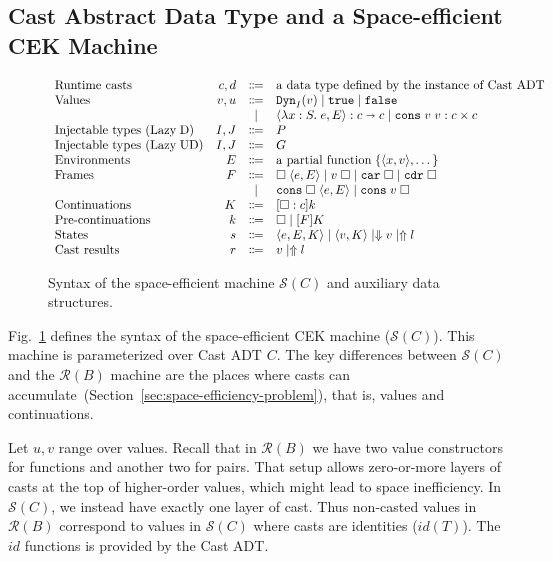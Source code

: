 \documentclass[runningheads]{llncs}
\newcommand{\stxrule}[3]{\text{#2} & #1 & \Coloneqq & #3\\}
\newcommand{\stxrulecont}[1]{& & | & #1 \\}
\newcommand{\figref}[1]{Fig.~\ref{#1}}
\newcommand{\secref}[1]{Section~\ref{#1}}
\newcommand{\LUD}{\ensuremath{\text{Lazy\;UD}}}
\newcommand{\LD}{\ensuremath{\text{Lazy\;D}}}
\newcommand{\RMachine}[1]{\ensuremath{\mathcal{R}(#1)}}
\newcommand{\SMachine}[1]{\ensuremath{\mathcal{S}(#1)}}
\newcommand{\error}[1]{\ensuremath{\Uparrow#1}}
\newcommand{\Pfunc}[2]{\ensuremath{#1 \shortrightarrow #2}}
\newcommand{\Pprod}[2]{\ensuremath{#1 \times #2}}
\newcommand{\elam}[3]{\lambda#1:#2.\;#3}
\newcommand{\eapp}[2]{#1\;#2}
\newcommand{\econs}[2]{\mathtt{cons} \; #1 \; #2}
\newcommand{\ecar}[1]{\mathtt{car} \; #1}
\newcommand{\ecdr}[1]{\mathtt{cdr} \; #1}
\newcommand{\ecast}[2]{\ensuremath{#1 : #2}}
\newcommand{\vdyn}[2]{\mathtt{Dyn}_{#1}(#2)}
\newcommand{\vtrue}[0]{\mathtt{true}}
\newcommand{\vfalse}[0]{\mathtt{false}}
\newcommand{\vfunc}[4]{\langle\elam{#1}{#2}{#3},#4\rangle}
\newcommand{\vcons}[2]{\econs{#1}{#2}}
\newcommand{\sexpr}[3]{\ensuremath{\langle#1,#2,#3\rangle}}
\newcommand{\scont}[2]{\ensuremath{\langle#1,#2\rangle}}
\newcommand{\shalt}[1]{\ensuremath{\Downarrow #1}}
\newcommand{\Knil}[0]{\Box}
\newcommand{\Kcons}[2]{[#1]#2}
\newcommand{\closure}[2]{\langle#1,#2\rangle}
\newcommand{\FappXO}[2]{\eapp{\square}{\closure{#1}{#2}}}
\newcommand{\FappOX}[1]{\eapp{#1}{\square}}
\newcommand{\FconsXO}[2]{\econs{\square}{\closure{#1}{#2}}}
\newcommand{\FconsOX}[1]{\econs{#1}{\square}}
\newcommand{\Fcar}[0]{\ecar{\square}}
\newcommand{\Fcdr}[0]{\ecdr{\square}}
\newcommand{\Fcast}[1]{\ecast{\square}{#1}}
\begin{document}
\subsection{Cast Abstract Data Type and a Space-efficient CEK Machine}
\label{sec:cast-adt-and-space-efficient-cek}

\begin{figure}
	\[
	\begin{array}{lrcl}
	\stxrule{c,d}{Runtime casts}{\text{a data type defined by the 
	instance of Cast ADT}}
	\stxrule{v,u}{Values}{
		\vdyn{I}{v}  \mid
		\vtrue       \mid
		\vfalse                     
	}
	\stxrulecont{
		\ecast{\vfunc{x}{S}{e}{E}}{\Pfunc{c}{c}} \mid
		\ecast{\vcons{v}{v}}{\Pprod{c}{c}}
	}
	\stxrule{I,J}{Injectable types (\LD)}{P}
	\stxrule{I,J}{Injectable types (\LUD)}{G}
	\stxrule{E}{Environments}{
		\text{a partial function}\;\{\langle x , v \rangle , \dots \}
	}
	\stxrule{F}{Frames}{
		\FappXO{e}{E}  \mid
		\FappOX{v}     \mid
		\Fcar          \mid
		\Fcdr
	}
	\stxrulecont{
		\FconsXO{e}{E}  \mid
		\FconsOX{v}
	}
	\stxrule{K}{Continuations}{
		\Kcons{\Fcast{c}}{k}
	}
	\stxrule{k}{Pre-continuations}{
		\Knil         \mid
		\Kcons{F}{K}
	}
	\stxrule{s}{States}{
		\sexpr{e}{E}{K}  \mid
		\scont{v}{K}     \mid
		\shalt{v}        \mid
		\error{l}
	}
	\stxrule{r}{Cast results}{
		v \mid
		\error{l}
	}
	\end{array}
	\]
	
	\caption{Syntax of the space-efficient machine \SMachine{C} and auxiliary 
	data structures.}
	\label{fig:SEMachine-state}
\end{figure}

\figref{fig:SEMachine-state} defines the syntax of the space-efficient CEK 
machine (\SMachine{C}). This machine is parameterized over Cast ADT $C$.
%
The key differences between \SMachine{C} and the \RMachine{B} machine are the 
places where casts can accumulate~(\secref{sec:space-efficiency-problem}), that 
is, values and continuations.

Let $u,v$ range over values.
%
Recall that in \RMachine{B} we have two value constructors for functions and 
another two for pairs. That setup allows zero-or-more layers of casts at the 
top of higher-order values, which might lead to space inefficiency. 
%
In \SMachine{C}, we instead have exactly one layer of cast. 
Thus non-casted values in \RMachine{B} correspond to values 
in \SMachine{C} where casts are identities ($\mathit{id}(T)$). The 
$\mathit{id}$ functions is provided by the Cast ADT.
\end{document}
